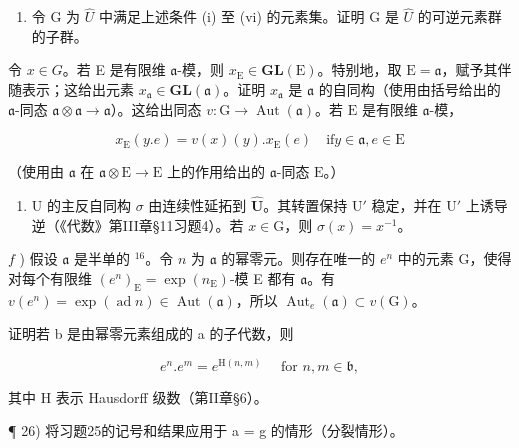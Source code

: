 \begin{enumerate}
\def\labelenumi{\alph{enumi})}
\setcounter{enumi}{3}
\tightlist
\item
  令 G 为 \(\hat{U}\) 中满足上述条件 (i) 至 (vi) 的元素集。证明 G 是 \(\hat{U}\) 的可逆元素群的子群。
\end{enumerate}

令 \(x \in G\)。若 E 是有限维 \(\mathfrak{a}\)-模，则 \(x_{\mathrm{E}} \in \mathbf{GL}(\mathrm{E})\)。特别地，取 \(\mathrm{E} = \mathfrak{a}\)，赋予其伴随表示；这给出元素 \(x_{\mathfrak{a}} \in \mathbf{GL}(\mathfrak{a})\)。证明 \(x_{\mathfrak{a}}\) 是 \(\mathfrak{a}\) 的自同构（使用由括号给出的 \(\mathfrak{a}\)-同态 \(\mathfrak{a} \otimes \mathfrak{a} \to \mathfrak{a}\)）。这给出同态 \(v: \mathrm{G} \to \operatorname{Aut}(\mathfrak{a})\)。若 \(\mathrm{E}\) 是有限维 \(\mathfrak{a}\)-模，

\[
x _ {\mathrm{E}} (y. e) = v (x) (y). x _ {\mathrm{E}} (e) \quad \mathrm{if} y \in \mathfrak {a}, e \in \mathrm{E}
\]

（使用由 \(\mathfrak{a}\) 在 \(\mathfrak{a} \otimes \mathrm{E} \to \mathrm{E}\) 上的作用给出的 \(\mathfrak{a}\)-同态 \(\mathrm{E}\)。）

\begin{enumerate}
\def\labelenumi{\alph{enumi})}
\setcounter{enumi}{4}
\tightlist
\item
  U 的主反自同构 \(\sigma\) 由连续性延拓到 \(\hat{\mathbf{U}}\)。其转置保持 \(\mathrm{U}'\) 稳定，并在 \(\mathrm{U}'\) 上诱导逆（《代数》第III章§11习题4）。若 \(x \in \mathrm{G}\)，则 \(\sigma(x) = x^{-1}\)。
\end{enumerate}

\(f\) ) 假设 \(\mathfrak{a}\) 是半单的 \(^{16}\)。令 \(n\) 为 \(\mathfrak{a}\) 的幂零元。则存在唯一的 \(e^n\) 中的元素 \(\mathrm{G}\)，使得对每个有限维 \((e^n)_{\mathrm{E}} = \exp (n_{\mathrm{E}})\)-模 E 都有 \(\mathfrak{a}\)。有 \(v(e^n) = \exp (\operatorname {ad}n)\in \operatorname {Aut}(\mathfrak{a})\)，所以 \(\operatorname {Aut}_e(\mathfrak{a})\subset v(\mathrm{G})\)。

证明若 b 是由幂零元素组成的 a 的子代数，则

\[
e ^ {n}. e ^ {m} = e ^ {\mathrm{H} (n, m)} \quad \text { for } n, m \in \mathfrak {b},
\]

其中 H 表示 Hausdorff 级数（第II章§6）。

¶ 26) 将习题25的记号和结果应用于 a = g 的情形（分裂情形）。

